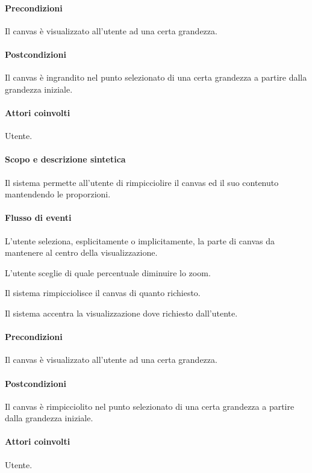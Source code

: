 \paragraph{Precondizioni} Il canvas \`e visualizzato all'utente ad una certa grandezza.
\paragraph{Postcondizioni} Il canvas \`e ingrandito nel punto selezionato di una certa grandezza a partire dalla grandezza iniziale.

\paragraph{Attori coinvolti} Utente.
\paragraph{Scopo e descrizione sintetica} 
Il sistema permette all'utente di rimpicciolire il canvas ed il suo contenuto mantendendo le proporzioni.
\paragraph{Flusso di eventi}
\begin{elenconumerato}[\textbf{}]{\subsubsecindent}
\item L'utente seleziona, esplicitamente o implicitamente, la parte di canvas da mantenere al centro della visualizzazione.
\item L'utente sceglie di quale percentuale diminuire lo zoom.
\item Il sistema rimpicciolisce il canvas di quanto richiesto.
\item Il sistema accentra la visualizzazione dove richiesto dall'utente.
\end{elenconumerato}
\paragraph{Precondizioni} Il canvas \`e visualizzato all'utente ad una certa grandezza.
\paragraph{Postcondizioni} Il canvas \`e rimpicciolito nel punto selezionato di una certa grandezza a partire dalla grandezza iniziale.

\paragraph{Attori coinvolti} Utente.
